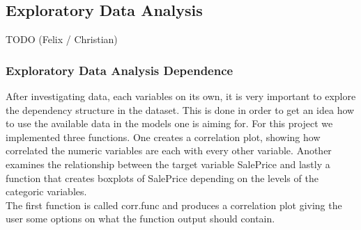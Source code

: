 \subsection{Exploratory Data Analysis}
TODO (Felix / Christian)
\subsubsection{Exploratory Data Analysis Dependence}
After investigating data, each variables on its own, it is very important to explore the dependency structure in the dataset. This is done in order to get an idea how to use the available data in the models one is aiming for. For this project we implemented three functions. One creates a correlation plot, showing how correlated the numeric variables are each with every other variable. Another examines the relationship between the target variable SalePrice and lastly a function that creates boxplots of SalePrice depending on the levels of the categoric variables. \\
The first function is called corr.func and produces a correlation  plot giving the user some options on what the function output should contain.
